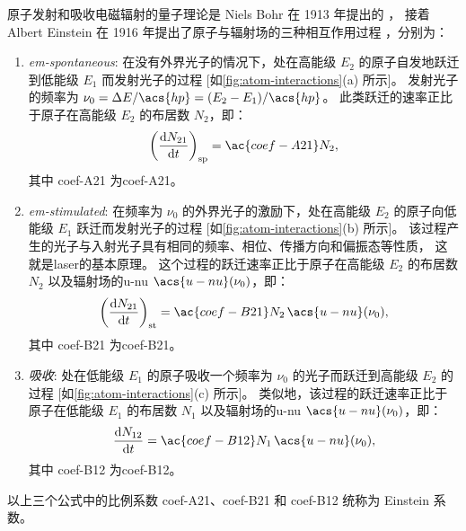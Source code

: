 原子发射和吸收电磁辐射的量子理论是 Niels Bohr 在 1913 年提出的 \cite{bohr1913}，
接着 Albert Einstein 在 1916 年提出了原子与辐射场的三种相互作用过程
\cite{einstein1916}，分别为：
\begin{enumerate}
\item \emph{\acf{em-spontaneous}}:
  在没有外界光子的情况下，处在高能级 $E_2$ 的原子自发地跃迁到低能级 $E_1$
  而发射光子的过程 [如\autoref{fig:atom-interactions}(a) 所示]。
  发射光子的频率为 $\nu_0 = \Delta E / \acs{hp} = (E_2 - E_1) / \acs{hp}$。
  此类跃迁的速率正比于原子在高能级 $E_2$ 的布居数 $N_2$，即：
  \begin{equation}
    \label{eq:rate-em-spontaneous}
    \left( \diff{N_{21}}{t} \right)_{\R{sp}} = \ac{coef-A21} N_2 ,
  \end{equation}
  其中 \ac{coef-A21} 为\acl{coef-A21}。

\item \emph{\acf{em-stimulated}}:
  在频率为 $\nu_0$ 的外界光子的激励下，处在高能级 $E_2$ 的原子向低能级 $E_1$
  跃迁而发射光子的过程 [如\autoref{fig:atom-interactions}(b) 所示]。
  该过程产生的光子与入射光子具有相同的频率、相位、传播方向和偏振态等性质，
  这就是\acf{laser}的基本原理。
  这个过程的跃迁速率正比于原子在高能级 $E_2$ 的布居数 $N_2$
  以及辐射场的\acl{u-nu} $\acs{u-nu}(\nu_0)$，即：
  \begin{equation}
    \label{eq:rate-em-stimulated}
    \left( \diff{N_{21}}{t} \right)_{\R{st}}
      = \ac{coef-B21} N_2 \, \acs{u-nu}(\nu_0) ,
  \end{equation}
  其中 \ac{coef-B21} 为\acl{coef-B21}。

\item \emph{吸收}:
  处在低能级 $E_1$ 的原子吸收一个频率为 $\nu_0$ 的光子而跃迁到高能级 $E_2$ 的过程
  [如\autoref{fig:atom-interactions}(c) 所示]。
  类似地，该过程的跃迁速率正比于原子在低能级 $E_1$ 的布居数 $N_1$
  以及辐射场的\acl{u-nu} $\acs{u-nu}(\nu_0)$，即：
  \begin{equation}
    \label{eq:rate-absorption}
    \diff{N_{12}}{t} = \ac{coef-B12} N_1 \, \acs{u-nu}(\nu_0) ,
  \end{equation}
  其中 \ac{coef-B12} 为\acl{coef-B12}。
\end{enumerate}
以上三个公式中的比例系数 \ac{coef-A21}、\ac{coef-B21} 和 \ac{coef-B12}
统称为 Einstein 系数。

